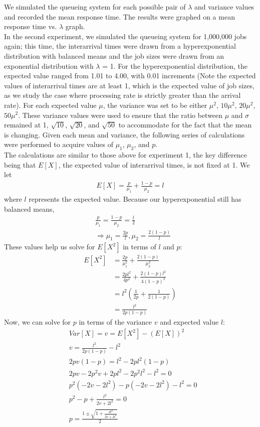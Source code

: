 \documentclass[12pt]{article}
\begin{document}
We simulated the queueing system for each possible pair of $\lambda$ and variance values and recorded the mean response time. The results were graphed on a mean response time vs. $\lambda$ graph. \\

In the second experiment, we simulated the queueing system for 1,000,000 jobs again; this time, the interarrival times were drawn from a hyperexponential distribution with balanced means and the job sizes were drawn from an exponential distribution with $\lambda$ = 1. For the hyperexponential distribution, the expected value ranged from 1.01 to 4.00, with 0.01 increments (Note the expected values of interarrival times are at least 1, which is the expected value of job sizes, as we study the case where processing rate is strictly greater than the arrival rate). For each expected value $\mu$, the variance was set to be either $\mu^2$, $10\mu^2$, $20\mu^2$, $50\mu^2$. These variance values were used to ensure that the ratio between $\mu$ and $\sigma$ remained at 1, $\sqrt{10}$, $\sqrt{20}$, and $\sqrt{50}$ to accommodate for the fact that the mean is changing. Given each mean and variance, the following series of calculations were performed to acquire values of $\mu_1$, $\mu_2$, and $p$. \\

The calculations are similar to those above for experiment 1, the key difference being that $E[X]$, the expected value of interarrival times, is not fixed at 1. We let
\begin{align*}
E[X] = \frac{p}{\mu_1} + \frac{1-p}{\mu_2} = l
\end{align*}
where $l$ represents the expected value. Because our hyperexponential still has balanced means, 
\begin{align*}
&\frac{p}{\mu_1} = \frac{1-p}{\mu_2} = \frac{l}{2} \\
&\Rightarrow \mu_1 = \frac{2p}{l}, \mu_2 = \frac{2(1-p)}{l}
\end{align*}
These values help us solve for $E[X^2]$ in terms of $l$ and $p$: 
\begin{align*}
E[X^2] &= \frac{2p}{\mu_1^2} + \frac{2(1-p)}{\mu_2^2} \\
&= \frac{2pl^2}{4p^2} + \frac{2(1-p)l^2}{4(1-p)^2} \\ 
&= l^2(\frac{1}{2p} + \frac{1}{2(1-p)}) \\
&= \frac{l^2}{2p(1-p)}
\end{align*}
Now, we can solve for $p$ in terms of the variance $v$ and expected value $l$: 
\begin{align*}
&Var[X] = v = E[X^2] - (E[X])^2 \\
&v = \frac{l^2}{2p(1-p)} - l^2 \\
&2pv(1-p) = l^2 - 2pl^2(1-p) \\ 
&2pv - 2p^2v + 2pl^2 - 2p^2l^2 - l^2 = 0 \\ 
&p^2(-2v - 2l^2) - p(-2v - 2l^2) - l^2 = 0 \\ 
&p^2 - p + \frac{l^2}{2v + 2l^2} = 0 \\ 
&p = \frac{1 \pm \sqrt{1 + \frac{4l^2}{2v + 2l^2}}}{2}
\end{align*}
\end{document}

